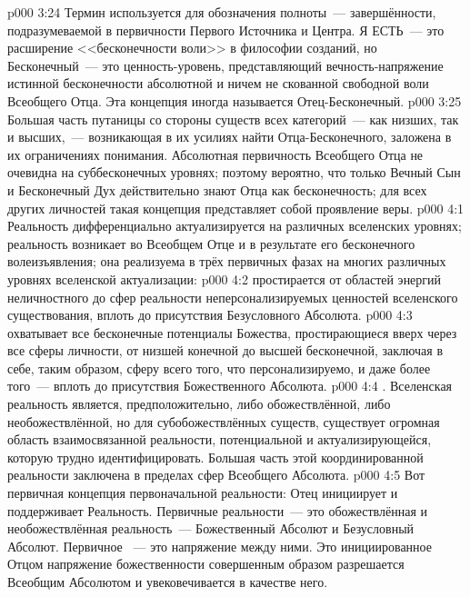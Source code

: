 \vs p000 3:24 \pc Термин  используется для обозначения полноты~--- завершённости, подразумеваемой в первичности Первого Источника и Центра.  Я ЕСТЬ~--- это расширение <<бесконечности воли>> в философии созданий, но Бесконечный~--- это  ценность\hyp{}уровень, представляющий вечность\hyp{}напряжение истинной бесконечности абсолютной и ничем не скованной свободной воли Всеобщего Отца. Эта концепция иногда называется Отец\hyp{}Бесконечный.
\vs p000 3:25 Большая часть путаницы со стороны существ всех категорий~--- как низших, так и высших,~--- возникающая в их усилиях найти Отца\hyp{}Бесконечного, заложена в их ограничениях понимания. Абсолютная первичность Всеобщего Отца не очевидна на суббесконечных уровнях; поэтому вероятно, что только Вечный Сын и Бесконечный Дух действительно знают Отца как бесконечность; для всех других личностей такая концепция представляет собой проявление веры.
\vs p000 4:1 Реальность дифференциально актуализируется на различных вселенских уровнях; реальность возникает во Всеобщем Отце и в результате его бесконечного волеизъявления; она реализуема в трёх первичных фазах на многих различных уровнях вселенской актуализации:
\vs p000 4:2  простирается от областей энергий неличностного до сфер реальности неперсонализируемых ценностей вселенского существования, вплоть до присутствия Безусловного Абсолюта.
\vs p000 4:3  охватывает все бесконечные потенциалы Божества, простирающиеся вверх через все сферы личности, от низшей конечной до высшей бесконечной, заключая в себе, таким образом, сферу всего того, что персонализируемо, и даже более того~--- вплоть до присутствия Божественного Абсолюта.
\vs p000 4:4 . Вселенская реальность является, предположительно, либо обожествлённой, либо необожествлённой, но для субобожествлённых существ, существует огромная область взаимосвязанной реальности, потенциальной и актуализирующейся, которую трудно идентифицировать. Большая часть этой координированной реальности заключена в пределах сфер Всеобщего Абсолюта.
\vs p000 4:5 Вот первичная концепция первоначальной реальности: Отец инициирует и поддерживает Реальность. Первичные  реальности~--- это обожествлённая и необожествлённая реальность~--- Божественный Абсолют и Безусловный Абсолют. Первичное ~--- это напряжение между ними. Это инициированное Отцом напряжение божественности совершенным образом разрешается Всеобщим Абсолютом и увековечивается в качестве него.
